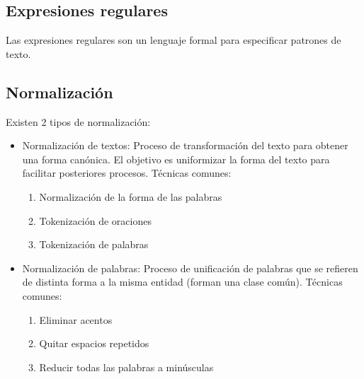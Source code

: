 \documentclass{ctexart}
\begin{document}
	\subsection{Expresiones regulares}
	\begin{flushleft}
		Las expresiones regulares son un lenguaje formal para especificar patrones de texto.
	\end{flushleft}
	\subsection{Normalización}
	\begin{flushleft}
		Existen 2 tipos de normalización:
		\begin{itemize}
			\item Normalización de textos: Proceso de transformación del texto para obtener una forma canónica. El objetivo es uniformizar la forma del texto para facilitar posteriores procesos.
			Técnicas comunes:
			\begin{enumerate}
				\item Normalización de la forma de las palabras
				\item Tokenización de oraciones
				\item Tokenización de palabras
			\end{enumerate}
			\item Normalización de palabras: Proceso de unificación de palabras que se refieren de distinta	forma a la misma entidad (forman una clase común).
			Técnicas comunes:
			\begin{enumerate}
				\item Eliminar acentos
				\item Quitar espacios repetidos
				\item Reducir todas las palabras a minúsculas
			\end{enumerate}
		\end{itemize}
	\end{flushleft}
\end{document}
